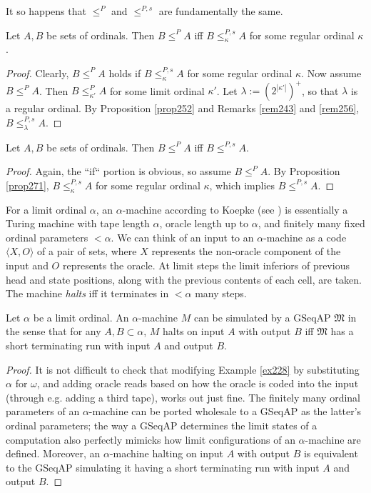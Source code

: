 \documentclass[12pt]{article}
\numberwithin{equation}{section}
\begin{document}
It so happens that $\leq^P$ and $\leq^{P, s}$ are fundamentally the same.

\begin{prop}\label{prop271}
Let $A, B$ be sets of ordinals. Then $B \leq^P A$ iff $B \leq^{P, s}_{\kappa} A$ for some regular ordinal $\kappa$.
\end{prop}

\begin{proof}
Clearly, $B \leq^P A$ holds if $B \leq^{P, s}_{\kappa} A$ for some regular ordinal $\kappa$. Now assume $B \leq^P A$. Then $B \leq^P_{\kappa'} A$ for some limit ordinal $\kappa'$. Let $\lambda := (2^{|\kappa'|})^+$, so that $\lambda$ is a regular ordinal. By Proposition \ref{prop252} and Remarks \ref{rem243} and \ref{rem256}, $B \leq^{P, s}_{\lambda} A$.
\end{proof}

\begin{prop}
Let $A, B$ be sets of ordinals. Then $B \leq^P A$ iff $B \leq^{P, s} A$.
\end{prop}

\begin{proof}
Again, the ``if`` portion is obvious, so assume $B \leq^P A$. By Proposition \ref{prop271}, $B \leq^{P, s}_{\kappa} A$ for some regular ordinal $\kappa$, which implies $B \leq^{P, s} A$.
\end{proof}

For a limit ordinal $\alpha$, an $\alpha$-machine according to Koepke (see \cite{koepke2}) is essentially a Turing machine with tape length $\alpha$, oracle length up to $\alpha$, and finitely many fixed ordinal parameters $< \alpha$. We can think of an input to an $\alpha$-machine as a code $\langle X, O \rangle$ of a pair of sets, where $X$ represents the non-oracle component of the input and $O$ represents the oracle. At limit steps the limit inferiors of previous head and state positions, along with the previous contents of each cell, are taken. The machine \emph{halts} iff it terminates in $< \alpha$ many steps.

\begin{prop}\label{prop270}
Let $\alpha$ be a limit ordinal. An $\alpha$-machine $M$ can be simulated by a GSeqAP $\mathfrak{M}$ in the sense that for any $A, B \subset \alpha$, $M$ halts on input $A$ with output $B$ iff $\mathfrak{M}$ has a short terminating run with input $A$ and output $B$.
\end{prop}

\begin{proof}
It is not difficult to check that modifying Example \ref{ex228} by substituting $\alpha$ for $\omega$, and adding oracle reads based on how the oracle is coded into the input (through e.g. adding a third tape), works out just fine. The finitely many ordinal parameters of an $\alpha$-machine can be ported wholesale to a GSeqAP as the latter's ordinal parameters; the way a GSeqAP determines the limit states of a computation also perfectly mimicks how limit configurations of an $\alpha$-machine are defined. Moreover, an $\alpha$-machine halting on input $A$ with output $B$ is equivalent to the GSeqAP simulating it having a short terminating run with input $A$ and output $B$.
\end{proof}
\end{document}
